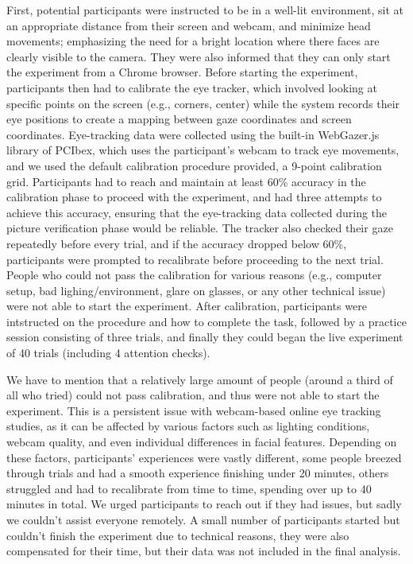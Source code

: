 \documentclass[ruler]{CUP-JNL-LIN}%
\begin{document}
First, potential participants were instructed to be in a well-lit environment, sit at an appropriate distance from their screen and webcam, and minimize head movements; emphasizing the need for a bright location where there faces are clearly visible to the camera. They were also informed that they can only start the experiment from a Chrome browser. Before starting the experiment, participants then had to calibrate the eye tracker, which involved looking at specific points on the screen (e.g., corners, center) while the system records their eye positions to create a mapping between gaze coordinates and screen coordinates. Eye-tracking data were collected using the built-in WebGazer.js library of PCIbex, which uses the participant's webcam to track eye movements, and we used the default calibration procedure provided, a 9-point calibration grid. Participants had to reach and maintain at least 60\% accuracy in the calibration phase to proceed with the experiment, and had three attempts to achieve this accuracy, ensuring that the eye-tracking data collected during the picture verification phase would be reliable. The tracker also checked their gaze repeatedly before every trial, and if the accuracy dropped below 60\%, participants were prompted to recalibrate before proceeding to the next trial. People who could not pass the calibration for various reasons (e.g., computer setup, bad lighing/environment, glare on glasses, or any other technical issue) were not able to start the experiment. After calibration, participants were intstructed on the procedure and how to complete the task, followed by a practice session consisting of three trials, and finally they could began the live experiment of 40 trials (including 4 attention checks).

We have to mention that a relatively large amount of people (around a third of all who tried) could not pass calibration, and thus were not able to start the experiment. This is a persistent issue with webcam-based online eye tracking studies, as it can be affected by various factors such as lighting conditions, webcam quality, and even individual differences in facial features. Depending on these factors, participants' experiences were vastly different, some people breezed through trials and had a smooth experience finishing under 20 minutes, others struggled and had to recalibrate from time to time, spending over up to 40 minutes in total. We urged participants to reach out if they had issues, but sadly we couldn't assist everyone remotely. A small number of participants started but couldn't finish the experiment due to technical reasons, they were also compensated for their time, but their data was not included in the final analysis.
\end{document}
